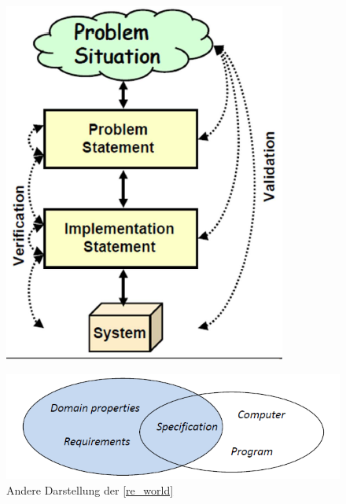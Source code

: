 \begin{figure}[!h]
	\centering
	\includegraphics[scale=0.7]{img/verification_and_validation.png}
\end{figure}

\begin{figure}[!h]
	\centering
	\includegraphics[scale=0.7]{img/re_world_other.png}
	\caption{Andere Darstellung der \ref{re_world}}
\end{figure}


